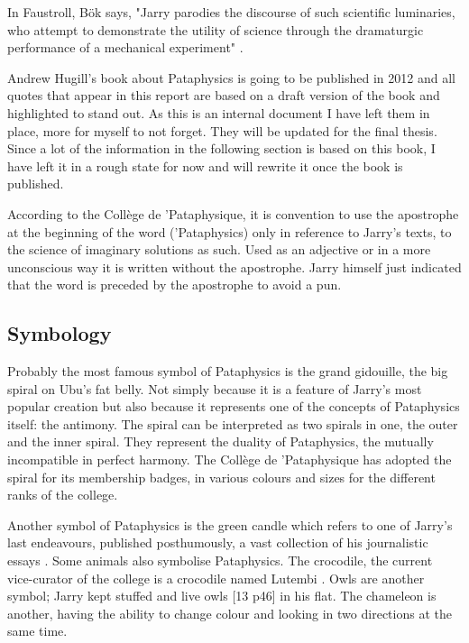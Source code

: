 In Faustroll, Bök says, "Jarry parodies the discourse of such scientific luminaries, who attempt to demonstrate the utility of science through the dramaturgic performance of a mechanical experiment" \citep[p.29]{Bok2002}.

\begin{shaded}
  Andrew Hugill's book about Pataphysics \citep{Hugill2012} is going to be published in 2012 and all quotes that appear in this report are based on a draft version of the book and highlighted to stand out. As this is an internal document I have left them in place, more for myself to not forget. They will be updated for the final thesis. Since a lot of the information in the following section is based on this book, I have left it in a rough state for now and will rewrite it once the book is published.
\end{shaded}

According to the Collège de 'Pataphysique, it is convention to use the apostrophe at the beginning of the word ('Pataphysics) only in reference to Jarry's texts, to the science of imaginary solutions as such. Used as an adjective or in a more unconscious way it is written without the apostrophe. Jarry himself just indicated that the word is preceded by the apostrophe to avoid a pun.

\subsection{Symbology}

Probably the most famous symbol of Pataphysics is the grand gidouille, the big spiral on Ubu's fat belly. Not simply because it is a feature of Jarry's most popular creation but also because it represents one of the concepts of Pataphysics itself: the antimony. The spiral can be interpreted as two spirals in one, the outer and the inner spiral. They represent the duality of Pataphysics, the mutually incompatible in perfect harmony. The Collège de 'Pataphysique has adopted the spiral for its membership badges, in various colours and sizes for the different ranks of the college.

Another symbol of Pataphysics is the green candle which refers to one of Jarry's last endeavours, published posthumously, a vast collection of his journalistic essays \citep{Hugill2012}. Some animals also symbolise Pataphysics. The crocodile, the current vice-curator of the college is a crocodile named Lutembi \citep{Hugill2012}. Owls are another symbol; Jarry kept stuffed and live owls \citep[p.46]{Brotchie2011}[13 p46] in his flat. The chameleon is another, having the ability to change colour and looking in two directions at the same time.

